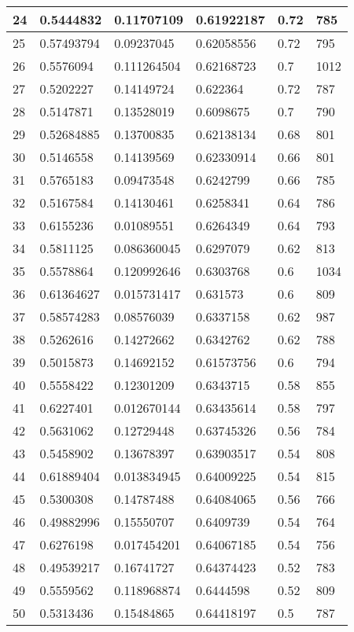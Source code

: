 \begin{longtable}{|l|l|l|l|l|l|}
24 & 0.5444832 & 0.11707109 & 0.61922187 & 0.72 & 785 \\ \hline 
25 & 0.57493794 & 0.09237045 & 0.62058556 & 0.72 & 795 \\ \hline 
26 & 0.5576094 & 0.111264504 & 0.62168723 & 0.7 & 1012 \\ \hline 
27 & 0.5202227 & 0.14149724 & 0.622364 & 0.72 & 787 \\ \hline 
28 & 0.5147871 & 0.13528019 & 0.6098675 & 0.7 & 790 \\ \hline 
29 & 0.52684885 & 0.13700835 & 0.62138134 & 0.68 & 801 \\ \hline 
30 & 0.5146558 & 0.14139569 & 0.62330914 & 0.66 & 801 \\ \hline 
31 & 0.5765183 & 0.09473548 & 0.6242799 & 0.66 & 785 \\ \hline 
32 & 0.5167584 & 0.14130461 & 0.6258341 & 0.64 & 786 \\ \hline 
33 & 0.6155236 & 0.01089551 & 0.6264349 & 0.64 & 793 \\ \hline 
34 & 0.5811125 & 0.086360045 & 0.6297079 & 0.62 & 813 \\ \hline 
35 & 0.5578864 & 0.120992646 & 0.6303768 & 0.6 & 1034 \\ \hline 
36 & 0.61364627 & 0.015731417 & 0.631573 & 0.6 & 809 \\ \hline 
37 & 0.58574283 & 0.08576039 & 0.6337158 & 0.62 & 987 \\ \hline 
38 & 0.5262616 & 0.14272662 & 0.6342762 & 0.62 & 788 \\ \hline 
39 & 0.5015873 & 0.14692152 & 0.61573756 & 0.6 & 794 \\ \hline 
40 & 0.5558422 & 0.12301209 & 0.6343715 & 0.58 & 855 \\ \hline 
41 & 0.6227401 & 0.012670144 & 0.63435614 & 0.58 & 797 \\ \hline 
42 & 0.5631062 & 0.12729448 & 0.63745326 & 0.56 & 784 \\ \hline 
43 & 0.5458902 & 0.13678397 & 0.63903517 & 0.54 & 808 \\ \hline 
44 & 0.61889404 & 0.013834945 & 0.64009225 & 0.54 & 815 \\ \hline 
45 & 0.5300308 & 0.14787488 & 0.64084065 & 0.56 & 766 \\ \hline 
46 & 0.49882996 & 0.15550707 & 0.6409739 & 0.54 & 764 \\ \hline 
47 & 0.6276198 & 0.017454201 & 0.64067185 & 0.54 & 756 \\ \hline 
48 & 0.49539217 & 0.16741727 & 0.64374423 & 0.52 & 783 \\ \hline 
49 & 0.5559562 & 0.118968874 & 0.6444598 & 0.52 & 809 \\ \hline 
50 & 0.5313436 & 0.15484865 & 0.64418197 & 0.5 & 787 \\ \hline 
\end{longtable}